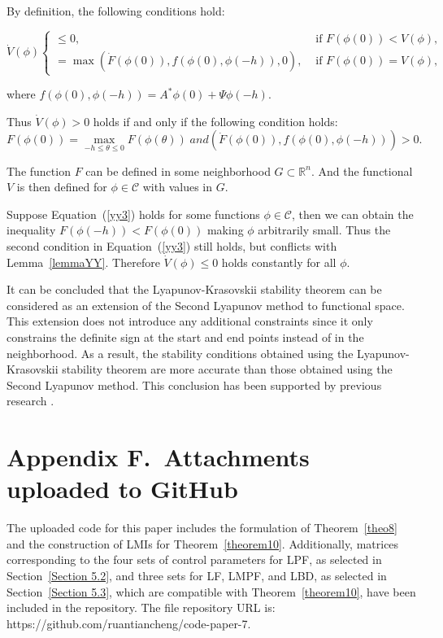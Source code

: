 \documentclass[a4paper]{cas-sc}
\begin{document}
By definition, the following conditions hold:
\begin{small}
\begin{equation}
  \dot{V}(\phi)\left\{\begin{array}{cl}
    \leq 0,                                                          & \text { if } F(\phi(0))<V(\phi), \\
    =\max \left(\dot{F}(\phi(0)), f(\phi(0), \phi(-h)), 0\right), & \text { if } F(\phi(0))=V(\phi),
  \end{array}\right.
\end{equation}
\end{small}
where $f(\phi(0), \phi(-h))=A^*\phi(0)+\Psi\phi(-h)$.

Thus $\dot{V}\left(\phi\right)>0$ holds if and only if the following condition holds:
\begin{equation}
  F(\phi (0)) = \mathop {\max }\limits_{ - h \le \theta  \le 0} F(\phi (\theta ))\;and(\dot F(\phi (0)),f(\phi(0), \phi(-h))) > 0.
  \label{yy3}
\end{equation}

The function $F$ can be defined in some neighborhood $G\subset\mathbb{R}^n$. And the functional $V$ is then defined for $\phi\in\mathcal{C}$ with values in $G$.

Suppose Equation~(\ref{yy3}) holds for some functions $\phi\in\mathcal{C}$, then we can obtain the inequality $F\left(\phi\left(-h\right)\right)<F\left(\phi\left(0\right)\right)$ making $\phi$ arbitrarily small. Thus the second condition in Equation~(\ref{yy3}) still holds, but conflicts with Lemma~\ref{lemmaYY}. Therefore $\dot{V}\left(\phi\right)\le0$ holds constantly for all $\phi$.

It can be concluded that the Lyapunov-Krasovskii stability theorem can be considered as an extension of the Second Lyapunov method to functional space. This extension does not introduce any additional constraints since it only constrains the definite sign at the start and end points instead of in the neighborhood. As a result, the stability conditions obtained using the Lyapunov-Krasovskii stability theorem are more accurate than those obtained using the Second Lyapunov method. This conclusion has been supported by previous research \citep{wang2016fuzzy,lian2020dissipativity}.

\section*{Appendix F.~Attachments uploaded to GitHub}
\label{AppendixF}
The uploaded code for this paper includes the formulation of Theorem~\ref{theo8} and the construction of LMIs for Theorem~\ref{theorem10}. Additionally, matrices corresponding to the four sets of control parameters for LPF, as selected in Section~\ref{Section 5.2}, and three sets for LF, LMPF, and LBD, as selected in Section~\ref{Section 5.3}, which are compatible with Theorem~\ref{theorem10}, have been included in the repository. The file repository URL is: https://github.com/ruantiancheng/code-paper-7.
\end{document}

